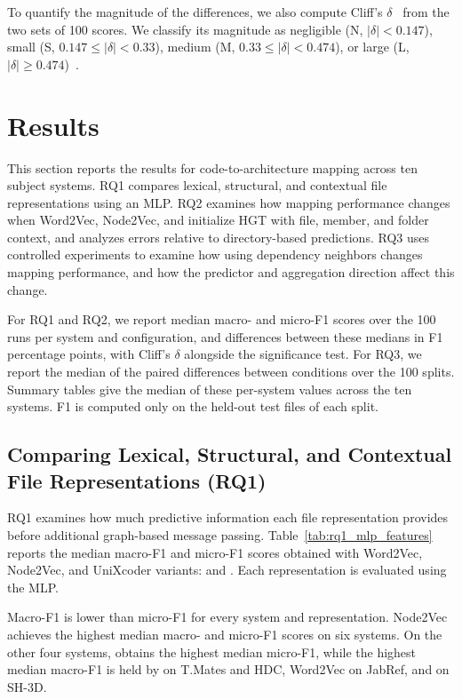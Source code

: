 To quantify the magnitude of the differences, we also compute Cliff's $\delta$~\cite{cliff} from the two sets of 100 scores. We classify its magnitude as negligible (N, $|\delta|<0.147$), small (S, $0.147\leq|\delta|<0.33$), medium (M, $0.33\leq|\delta|<0.474$), or large (L, $|\delta|\geq0.474$)~\cite{romano2006}.
\section{Results\label{sec:results}}
This section reports the results for code-to-architecture mapping across ten subject systems. RQ1 compares lexical, structural, and contextual file representations using an MLP. RQ2 examines how mapping performance changes when Word2Vec, Node2Vec, and \ft{} initialize HGT with file, member, and folder context, and analyzes errors relative to directory-based predictions. RQ3 uses controlled experiments to examine how using dependency neighbors changes mapping performance, and how the predictor and aggregation direction affect this change.

For RQ1 and RQ2, we report median macro- and micro-F1 scores over the 100 runs per system and configuration, and differences between these medians in F1 percentage points, with Cliff's $\delta$ alongside the significance test. For RQ3, we report the median of the paired differences between conditions over the 100 splits. Summary tables give the median of these per-system values across the ten systems. F1 is computed only on the held-out test files of each split.
\subsection{Comparing Lexical, Structural, and Contextual File Representations (RQ1)\label{sec:rq1}}

RQ1 examines how much predictive information each file representation provides before additional graph-based message passing. Table~\ref{tab:rq1_mlp_features} reports the median macro-F1 and micro-F1 scores obtained with Word2Vec, Node2Vec, and UniXcoder variants: \zs{} and \ft{}. Each representation is evaluated using the MLP.


Macro-F1 is lower than micro-F1 for every system and representation. Node2Vec achieves the highest median macro- and micro-F1 scores on six systems. On the other four systems, \ft{} obtains the highest median micro-F1, while the highest median macro-F1 is held by \ft{} on T.Mates and HDC, Word2Vec on JabRef, and \zs{} on SH-3D.

